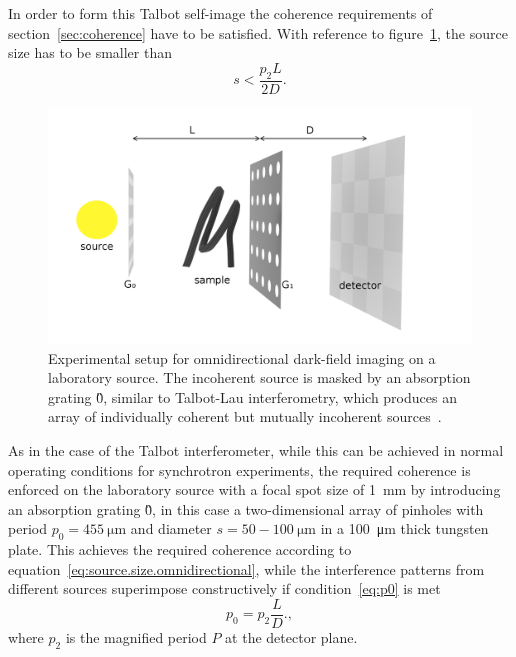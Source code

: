 In order to form this Talbot self-image the coherence requirements of
section~\ref{sec:coherence} have to be satisfied. With reference to
figure~\ref{fig:omnidirectional-lab}, the source size has to be
smaller than
\begin{equation}
    s < \frac{p_2L}{2D}.
    \label{eq:source.size.omnidirectional}
\end{equation}

\begin{figure}[htb]
    \centering
    \includegraphics[width=\textwidth]{gfx/omnidirectional/schematic-with-arrows.png}
    \caption{Experimental setup for omnidirectional dark-field imaging on a
    laboratory source. The incoherent source is masked by an absorption
grating \G0, similar to Talbot-Lau interferometry, which produces an array
of individually coherent but mutually incoherent
sources~\parencite{kagias2018omnidir}.}
    \label{fig:omnidirectional-lab}
\end{figure}

As in the case of the Talbot interferometer, while this can be achieved in
normal operating conditions for synchrotron experiments, the required
coherence is enforced on the laboratory source with a focal spot size of
\SI{1}{\milli\meter} by introducing an absorption grating \G0, in this case
a two-dimensional array of pinholes with period $p_0 =
\SI{455}{\micro\meter}$ and diameter $s = 50-\SI{100}{\micro\meter}$ in a
\SI{100}{\micro\meter} thick tungsten
plate. This achieves the required coherence according to
equation~\eqref{eq:source.size.omnidirectional}, while the interference
patterns from different sources superimpose constructively if
condition~\eqref{eq:p0} is met
\begin{equation}
    p_0 = p_2 \frac{L}{D}.\label{eq:p0.omnidirectional},
\end{equation}
where $p_2$ is the magnified period $P$ at the detector plane.

